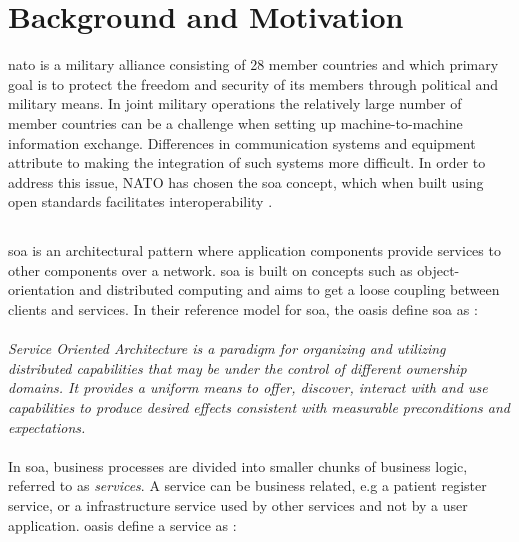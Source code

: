 \section{Background and Motivation}

\gls{nato} is a military alliance consisting of 28 member countries
\cite{nato-homepage-member-countries} and which primary goal is to protect the
freedom and security of its members through political and military means. In
joint military operations the relatively large number of member countries can be
a challenge when setting up machine-to-machine information exchange. Differences
in communication systems and equipment attribute to making the integration of
such systems more difficult. In order to address this issue, NATO has chosen the
\gls{soa} concept, which when built using open standards facilitates
interoperability \cite{nnec-study}.

\subsection{}
\gls{soa} is an architectural pattern where application components
provide services to other components over a network. \gls{soa} is built on
concepts such as object-orientation and distributed computing and aims to get
a loose coupling between clients and services. In their reference model for
\gls{soa}, the \gls{oasis} define \gls{soa} as \cite{oasis-soa-reference-model}:

\paragraph{}

\textit{Service Oriented Architecture is a paradigm for organizing and utilizing
distributed capabilities that may be under the control of different ownership
domains. It provides a uniform means to offer, discover, interact with and use
capabilities to produce desired effects consistent with measurable preconditions
and expectations.}

\paragraph{}

In \gls{soa}, business processes are divided into smaller chunks of business
logic, referred to as \textit{services}. A service can be business related, e.g
a patient register service, or a infrastructure service used by other services
and not by a user application. \gls{oasis} define a service as
\cite{oasis-soa-reference-model}:

